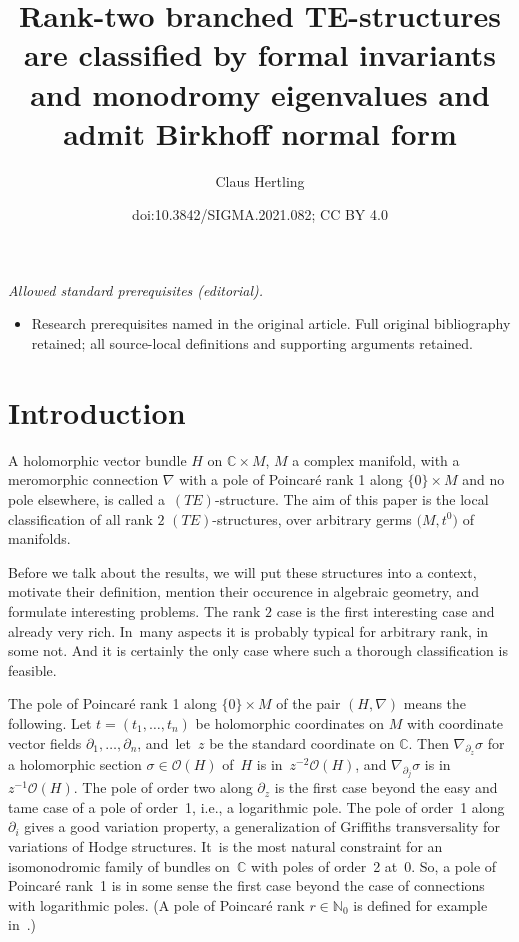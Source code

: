 \documentclass[10pt,a4paper]{amsart}
\title{Rank-two branched TE-structures are classified by formal invariants and monodromy eigenvalues and admit Birkhoff normal form}
\author{Claus Hertling}
\date{doi:10.3842/SIGMA.2021.082; CC BY 4.0}
\numberwithin{equation}{section}
\numberwithin{figure}{section}
\newcommand{\N}{{\mathbb N}}
\newcommand{\C}{{\mathbb C}}
\newcommand{\OO}{{\mathcal O}}
\newcommand{\paa}{\partial}
\newcommand{\nnn}{\nabla}
\begin{document}
\maketitle
\noindent\textit{Allowed standard prerequisites (editorial).}\begin{itemize}
\item Research prerequisites named in the original article. Full original bibliography retained; all source-local definitions and supporting arguments retained.
\end{itemize}\medskip
\section{Introduction}%

A holomorphic vector bundle $H$ on $\C\times M$, $M$ a complex
manifold, with a meromorphic connection $\nnn$ with a
pole of Poincar\'e rank 1 along $\{0\}\times M$ and no pole
elsewhere, is called a~$(TE)$-structure.
The aim of this paper is the local classification of all rank $2$
$(TE)$-structures, over arbitrary germs $\big(M,t^0\big)$ of manifolds.

Before we talk about the results, we will put these structures
into a context, motivate their definition,
mention their occurence in algebraic geometry,
and formulate interesting problems.
The rank $2$ case is the first interesting case and already
very rich. In~many aspects it is probably typical for
arbitrary rank, in some not. And it is certainly the only
case where such a thorough classification is feasible.

The pole of Poincar\'e rank 1 along $\{0\}\times M$ of the
pair $(H,\nnn)$ means the following. Let $t=(t_1,\dots ,t_n)$
be holomorphic coordinates on $M$ with coordinate
vector fields $\paa_1,\dots ,\paa_n$, and~let~$z$ be the standard
coordinate on $\C$. Then $\nnn_{\paa_z}\sigma$ for a
holomorphic section $\sigma\in\OO(H)$ of~$H$
is in~$z^{-2}\OO(H)$, and $\nnn_{\paa_j}\sigma$ is in
$z^{-1}\OO(H)$. The pole of order two along $\paa_z$
is the first case beyond the easy and tame case of a
pole of order~1, i.e., a logarithmic pole.
The pole of order~1 along~$\paa_i$ gives a good variation
property, a generalization of Griffiths transversality
for variations of Hodge structures. It~is the most natural
constraint for an isomonodromic family of bundles on~$\C$
with poles of order~2 at~$0$.
So, a pole of Poincar\'e rank~1 is in some sense the first
case beyond the case of connections with logarithmic poles.
(A pole of Poincar\'e rank $r\in\N_0$
is defined for example in~\cite[Section~0.14]{Sa02}.)
\end{document}
